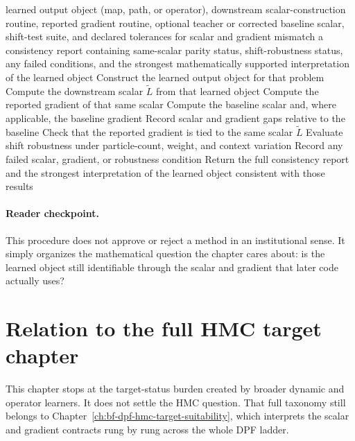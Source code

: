 \begin{algorithm}[ht]
\caption{\texttt{audit\_dynamic\_transport\_target\_contract}}
\begin{algorithmic}[1]
\Require learned output object (map, path, or operator), downstream scalar-construction routine, reported gradient routine, optional teacher or corrected baseline scalar, shift-test suite, and declared tolerances for scalar and gradient mismatch
\Ensure a consistency report containing same-scalar parity status, shift-robustness status, any failed conditions, and the strongest mathematically supported interpretation of the learned object
  \State Construct the learned output object for that problem
  \State Compute the downstream scalar \(\widetilde L\) from that learned object
  \State Compute the reported gradient of that same scalar
    \State Compute the baseline scalar and, where applicable, the baseline gradient
    \State Record scalar and gradient gaps relative to the baseline
  \EndIf
  \State Check that the reported gradient is tied to the same scalar \(\widetilde L\)
  \State Evaluate shift robustness under particle-count, weight, and context variation
  \State Record any failed scalar, gradient, or robustness condition
\EndFor
\State Return the full consistency report and the strongest interpretation of the learned object consistent with those results
\end{algorithmic}
\end{algorithm}

\paragraph{Reader checkpoint.}
This procedure does not approve or reject a method in an institutional sense.
It simply organizes the mathematical question the chapter cares about: is the
learned object still identifiable through the scalar and gradient that later
code actually uses?

\section{Relation to the full HMC target chapter}
\label{sec:bf-neural-ot-dynamic-handoff}

This chapter stops at the target-status burden created by broader dynamic and
operator learners.  It does not settle the HMC question.  That full taxonomy
still belongs to Chapter~\ref{ch:bf-dpf-hmc-target-suitability}, which
interprets the scalar and gradient contracts rung by rung across the whole DPF
ladder.


